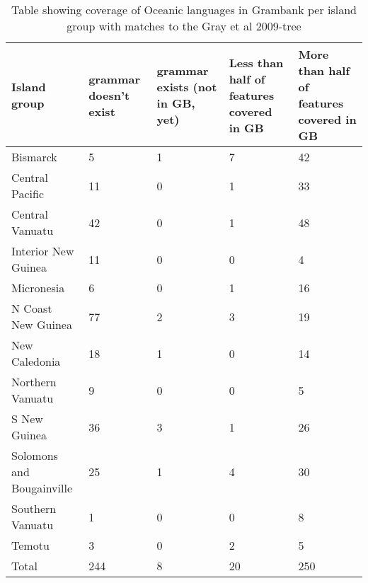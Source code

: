 \begin{table}[ht]
\centering
\begin{tabular}{p{5cm}p{2.7cm}p{2.7cm}p{2.7cm}p{2.7cm}}
  \hline
Island group & grammar doesn't exist & grammar exists (not in GB, yet) & Less than half of features covered in GB & More than half of features covered in GB \\ 
  \hline
Bismarck & 5 & 1 & 7 & 42 \\ 
  Central Pacific & 11 & 0 & 1 & 33 \\ 
  Central Vanuatu & 42 & 0 & 1 & 48 \\ 
  Interior New Guinea & 11 & 0 & 0 & 4 \\ 
  Micronesia & 6 & 0 & 1 & 16 \\ 
  N Coast New Guinea & 77 & 2 & 3 & 19 \\ 
  New Caledonia & 18 & 1 & 0 & 14 \\ 
  Northern Vanuatu & 9 & 0 & 0 & 5 \\ 
  S New Guinea & 36 & 3 & 1 & 26 \\ 
  Solomons and Bougainville & 25 & 1 & 4 & 30 \\ 
  Southern Vanuatu & 1 & 0 & 0 & 8 \\ 
  Temotu & 3 & 0 & 2 & 5 \\ 
  Total & 244 & 8 & 20 & 250 \\ 
   \hline
\end{tabular}
\caption{Table showing coverage of Oceanic languages in Grambank per island group with matches to the Gray et al 2009-tree} 
\label{GB_coverage_table_island_group_gray}
\end{table}
